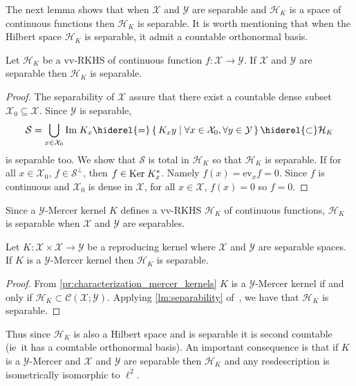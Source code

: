 The next lemma shows that when $\mathcal{X}$ and $\mathcal{Y}$ are separable
and $\mathcal{H}_K$ is a space of continuous functions then $\mathcal{H}_K$ is
separable. It is worth mentioning that when the Hilbert space $\mathcal{H}_K$
is separable, it admit a countable orthonormal basis.
\begin{lemma}
    \label{lm:separability} Let $\mathcal{H}_K$ be a \acl{vv-RKHS} of
    continuous function $f:\mathcal{X}\to\mathcal{Y}$. If $\mathcal{X}$ and
    $\mathcal{Y}$ are separable then $\mathcal{H}_K$ is separable.
\end{lemma}
\begin{proof}
    The separability of $\mathcal{X}$ assure that there exist a countable dense
    subset $\mathcal{X}_0\subseteq\mathcal{X}$. Since $\mathcal{Y}$ is
    separable,
    \begin{dmath*}
        \mathcal{S}=\bigcup_{x\in\mathcal{X}_0}\Ima K_x
        \hiderel{=}\set{K_xy|\forall x\in\mathcal{X}_0, \forall
        y\in\mathcal{Y}}\hiderel{\subset} \mathcal{H}_K
    \end{dmath*}
    is separable too. We show that $\mathcal{S}$ is total in $\mathcal{H}_K$ so
    that $\mathcal{H}_K$ is separable. If for all $x\in\mathcal{X}_0$,
    $f\in\mathcal{S}^{\perp}$, then $f\in\text{Ker}\; K_x^*$. Namely
    $f(x)=\text{ev}_xf=0$. Since $f$ is continuous and $\mathcal{X}_0$ is dense
    in $\mathcal{X}$, for all $x\in\mathcal{X}$, $f(x)=0$ so $f=0$.
\end{proof}
Since a $\mathcal{Y}$-Mercer kernel $K$ defines a \ac{vv-RKHS} $\mathcal{H}_K$
of continuous functions, $\mathcal{H}_K$ is separable when $\mathcal{X}$ and
$\mathcal{Y}$ are separables.
\begin{proposition}
    \label{pr:mercer_countable_basis} Let
    $K:\mathcal{X}\times\mathcal{X}\to\mathcal{Y}$ be a reproducing kernel
    where $\mathcal{X}$ and $\mathcal{Y}$ are separable spaces. If $K$ is a
    $\mathcal{Y}$-Mercer kernel then $\mathcal{H}_K$ is separable.
\end{proposition}
\begin{proof}
    From \cref{pr:characterization_mercer_kernels} $K$ is a
    $\mathcal{Y}$-Mercer kernel if and only if $\mathcal{H}_K\subset
    \mathcal{C}(\mathcal{X};\mathcal{Y})$. Applying \cref{lm:separability}
    of~\citet{carmeli2006vector}, we have that $\mathcal{H}_K$ is separable.
\end{proof}
Thus since $\mathcal{H}_K$ is also a Hilbert space and is separable it is
second countable (\acs{ie}~it has a countable orthonormal basis). An important
consequence is that if $K$ is a $\mathcal{Y}$-Mercer and $\mathcal{X}$ and
$\mathcal{Y}$ are separable then $\mathcal{H}_K$ and any resdescription is
isometrically isomorphic to $\ell^2$.

